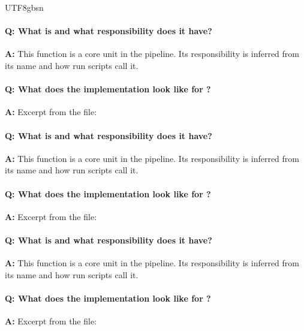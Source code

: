 \documentclass[11pt]{article}
\begin{document}
\begin{CJK*}{UTF8}{gbsn}
\vspace{1mm}


\paragraph{Q: What is \texttt{} and what responsibility does it have?}
\textbf{A:} This function is a core unit in the pipeline. Its responsibility is inferred from its name and how run scripts call it.

\paragraph{Q: What does the implementation look like for \texttt{}?}
\textbf{A:} Excerpt from the file:

\vspace{1mm}


\paragraph{Q: What is \texttt{} and what responsibility does it have?}
\textbf{A:} This function is a core unit in the pipeline. Its responsibility is inferred from its name and how run scripts call it.

\paragraph{Q: What does the implementation look like for \texttt{}?}
\textbf{A:} Excerpt from the file:

\vspace{1mm}


\paragraph{Q: What is \texttt{} and what responsibility does it have?}
\textbf{A:} This function is a core unit in the pipeline. Its responsibility is inferred from its name and how run scripts call it.

\paragraph{Q: What does the implementation look like for \texttt{}?}
\textbf{A:} Excerpt from the file:


\end{CJK*}
\end{document}
